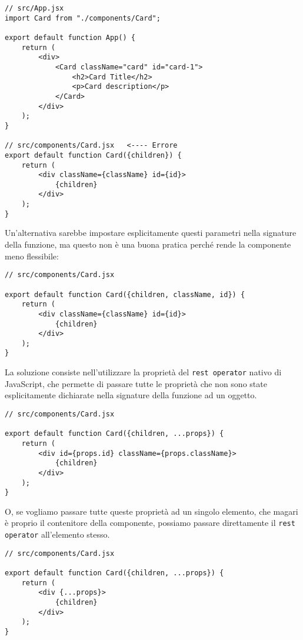 \documentclass[12pt]{article}
\begin{document}
\begin{verbatim}
// src/App.jsx
import Card from "./components/Card";

export default function App() {
    return (
        <div>
            <Card className="card" id="card-1">
                <h2>Card Title</h2>
                <p>Card description</p>
            </Card>
        </div>
    );
}

// src/components/Card.jsx   <---- Errore
export default function Card({children}) {
    return (
        <div className={className} id={id}>
            {children}
        </div>
    );
}
\end{verbatim}
Un'alternativa sarebbe impostare esplicitamente questi parametri
nella signature della funzione, ma questo non è una buona pratica
perché rende la componente meno flessibile:

\begin{verbatim}
// src/components/Card.jsx

export default function Card({children, className, id}) {
    return (
        <div className={className} id={id}>
            {children}
        </div>
    );
}
\end{verbatim}

La soluzione consiste nell'utilizzare la proprietà del {\tt rest operator}
nativo di JavaScript, che permette di passare tutte le proprietà
che non sono state esplicitamente dichiarate nella signature della funzione
ad un oggetto.

\begin{verbatim}
// src/components/Card.jsx

export default function Card({children, ...props}) {
    return (
        <div id={props.id} className={props.className}>
            {children}
        </div>
    );
}
\end{verbatim}

O, se vogliamo passare tutte queste proprietà ad un singolo
elemento, che magari è proprio il contenitore della componente,
possiamo passare direttamente il {\tt rest operator} all'elemento
stesso.

\begin{verbatim}
// src/components/Card.jsx

export default function Card({children, ...props}) {
    return (
        <div {...props}>
            {children}
        </div>
    );
}
\end{verbatim}
\end{document}

